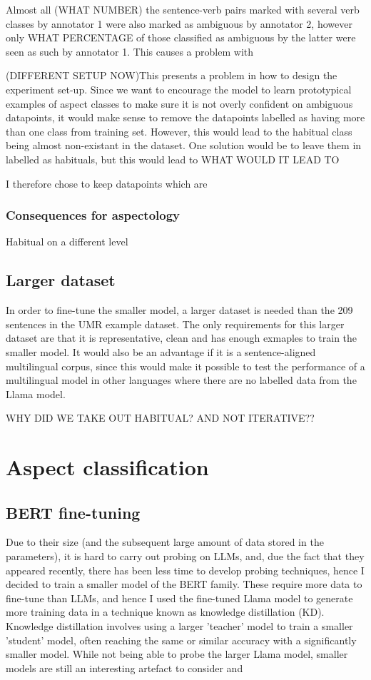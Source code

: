 Almost all (WHAT NUMBER) the sentence-verb pairs marked with several verb classes by annotator 1 were also marked as ambiguous by annotator 2, however only WHAT PERCENTAGE of those classified as ambiguous by the latter were seen as such by annotator 1. This causes a problem with 

(DIFFERENT SETUP NOW)This presents a problem in how to design the experiment set-up. Since we want to encourage the model to learn prototypical examples of aspect classes to make sure it is not overly confident on ambiguous datapoints, it would make sense to remove the datapoints labelled as having more than one class from training set. However, this would lead to the habitual class being almost non-existant in the dataset. One solution would be to leave them in labelled as habituals, but this would lead to WHAT WOULD IT LEAD TO

I therefore chose to keep datapoints which are 

\subsubsection{Consequences for aspectology}
Habitual on a different level

\subsection{Larger dataset}
In order to fine-tune the smaller model, a larger dataset is needed than the 209 sentences in the UMR example dataset. The only requirements for this larger dataset are that it is representative, clean and has enough exmaples to train the smaller model. It would also be an advantage if it is a sentence-aligned multilingual corpus, since this would make it possible to test the performance of a multilingual model in other languages where there are no labelled data from the Llama model. 

WHY DID WE TAKE OUT HABITUAL? AND NOT ITERATIVE??


\section{Aspect classification}

\subsection{BERT fine-tuning}
Due to their size (and the subsequent large amount of data stored in the parameters), it is hard to carry out probing on LLMs, and, due the fact that they appeared recently, there has been less time to develop probing techniques, hence I decided to train a smaller model of the BERT \citep{devlin2019bert} family. These require more data to fine-tune than LLMs, and hence I used the fine-tuned Llama model to generate more training data in a technique known as knowledge distillation (KD). Knowledge distillation involves using a larger 'teacher' model to train a smaller 'student' model, often reaching the same or similar accuracy with a significantly smaller model. While not being able to probe the larger Llama model, smaller models are still an interesting artefact to consider and 


